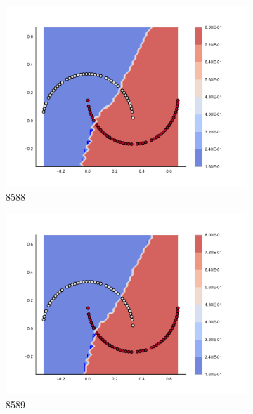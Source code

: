 \begin{figure}[h]
\begin{subfigure}[b]{0.09\textwidth}
    \includegraphics[clip, trim=2.35cm 1.75cm 4.5cm 0cm,width=\textwidth]{img/convergence/8588.pdf}
    \caption{8588}
    \label{fig:convergence_8588}
\end{subfigure}
%
\begin{subfigure}[b]{0.09\textwidth}
    \includegraphics[clip, trim=2.35cm 1.75cm 4.5cm 0cm,width=\textwidth]{img/convergence/8589.pdf}
    \caption{8589}
    \label{fig:convergence_8589}
\end{subfigure}
%
\begin{subfigure}[b]{0.09\textwidth}

\end{subfigure}
\end{figure}
